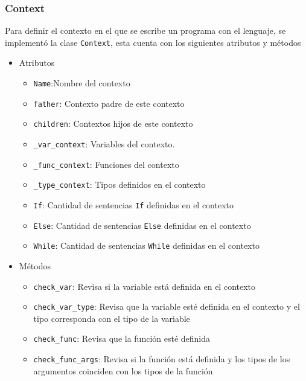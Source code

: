 \subsubsection{Context}
Para definir el contexto en el que se escribe un programa con el lenguaje, se implement\'o la clase \verb|Context|, esta cuenta con los siguientes atributos y m\'etodos 
\begin{itemize}
\item Atributos
\begin{itemize}
\item \verb|Name|:Nombre del contexto 

\item \verb|father|: Contexto padre de este contexto

\item \verb|children|: Contextos hijos de este contexto

\item \verb|_var_context|: Variables del contexto. 

\item \verb|_func_context|: Funciones del contexto

\item \verb|_type_context|: Tipos definidos en el contexto

\item \verb|If|: Cantidad de sentencias \verb|If| definidas en el contexto

\item \verb|Else|: Cantidad de sentencias \verb|Else| definidas en el contexto

\item \verb|While|: Cantidad de sentencias \verb|While| definidas en el contexto
\end{itemize}

\item M\'etodos
\begin{itemize}
\item \verb|check_var|: Revisa si la variable est\'a definida en el contexto

	\item \verb|check_var_type|: Revisa que la variable est\'e definida en el contexto y el tipo corresponda con el tipo de la variable
	
	\item \verb|check_func|: Revisa que la funci\'on est\'e definida
	
	\item \verb|check_func_args|: Revisa si la funci\'on est\'a definida y los tipos de los argumentos coinciden con los tipos de la funci\'on
	

\end{itemize}
\end{itemize}
